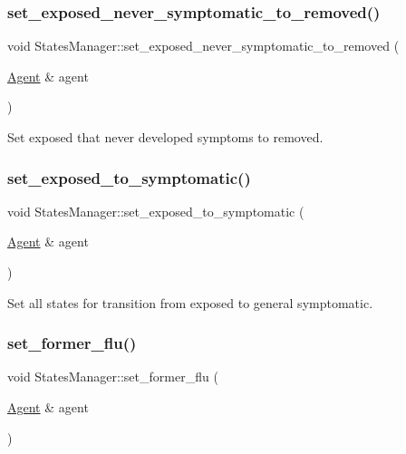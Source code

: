 \subsubsection{\texorpdfstring{set\+\_\+exposed\+\_\+never\+\_\+symptomatic\+\_\+to\+\_\+removed()}{set\_exposed\_never\_symptomatic\_to\_removed()}}
{\footnotesize\ttfamily void States\+Manager\+::set\+\_\+exposed\+\_\+never\+\_\+symptomatic\+\_\+to\+\_\+removed (\begin{DoxyParamCaption}\item[{\hyperlink{classAgent}{Agent} \&}]{agent }\end{DoxyParamCaption})}



Set exposed that never developed symptoms to removed. 

\mbox{\label{classStatesManager_a675b30619c98f0c4743d08aba0567dad}} 
\subsubsection{\texorpdfstring{set\+\_\+exposed\+\_\+to\+\_\+symptomatic()}{set\_exposed\_to\_symptomatic()}}
{\footnotesize\ttfamily void States\+Manager\+::set\+\_\+exposed\+\_\+to\+\_\+symptomatic (\begin{DoxyParamCaption}\item[{\hyperlink{classAgent}{Agent} \&}]{agent }\end{DoxyParamCaption})}



Set all states for transition from exposed to general symptomatic. 

\mbox{\label{classStatesManager_ad9059714401d4aaa66b88af987904e78}} 
\subsubsection{\texorpdfstring{set\+\_\+former\+\_\+flu()}{set\_former\_flu()}}
{\footnotesize\ttfamily void States\+Manager\+::set\+\_\+former\+\_\+flu (\begin{DoxyParamCaption}\item[{\hyperlink{classAgent}{Agent} \&}]{agent }\end{DoxyParamCaption})}



